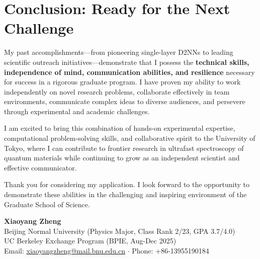 \documentclass[11pt,a4paper]{article}
\begin{document}
\section{Conclusion: Ready for the Next Challenge}

My past accomplishments—from pioneering single-layer D2NNs to leading scientific outreach initiatives—demonstrate that I possess the \textbf{technical skills, independence of mind, communication abilities, and resilience} necessary for success in a rigorous graduate program. I have proven my ability to work independently on novel research problems, collaborate effectively in team environments, communicate complex ideas to diverse audiences, and persevere through experimental and academic challenges.

I am excited to bring this combination of hands-on experimental expertise, computational problem-solving skills, and collaborative spirit to the University of Tokyo, where I can contribute to frontier research in ultrafast spectroscopy of quantum materials while continuing to grow as an independent scientist and effective communicator.

Thank you for considering my application. I look forward to the opportunity to demonstrate these abilities in the challenging and inspiring environment of the Graduate School of Science.

\vspace{0.5em}

\noindent
\textbf{Xiaoyang Zheng}\\
Beijing Normal University (Physics Major, Class Rank 2/23, GPA 3.7/4.0)\\
UC Berkeley Exchange Program (BPIE, Aug-Dec 2025)\\
Email: \href{mailto:xiaoyangzheng@mail.bnu.edu.cn}{xiaoyangzheng@mail.bnu.edu.cn} $\cdot$ Phone: +86-13955190184
\end{document}
